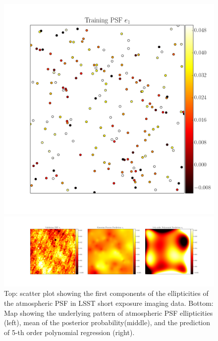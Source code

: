 \documentclass[12pt]{article}
\begin{document}
\begin{figure}[!htb]

  \includegraphics[width=\linewidth]{data_e1.png}
\endminipage

  \includegraphics[width=\linewidth]{validation_e1.png}
\endminipage

\caption{Top: scatter plot showing the first components of the ellipticities
of the atmospheric PSF in LSST short exposure imaging data. 
Bottom: Map showing the underlying pattern of atmospheric PSF ellipticities (left),
mean of the posterior probability(middle), and the prediction of 5-th
order polynomial regression (right).
\label{2}}
\end{figure}
\end{document}

